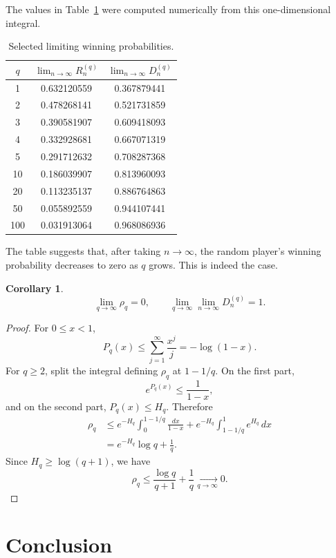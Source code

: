 \documentclass{article}
\newtheorem{corollary}{Corollary}
\begin{document}
The values in Table~\ref{tab:limits} were computed numerically from this
one-dimensional integral.

\begin{table}[h]
\centering
\begin{tabular}{ccc}
\toprule
$q$ & $\lim_{n\to\infty}R_n^{(q)}$ & $\lim_{n\to\infty}D_n^{(q)}$ \\
\midrule
1 & 0.632120559 & 0.367879441 \\
2 & 0.478268141 & 0.521731859 \\
3 & 0.390581907 & 0.609418093 \\
4 & 0.332928681 & 0.667071319 \\
5 & 0.291712632 & 0.708287368 \\
10 & 0.186039907 & 0.813960093 \\
20 & 0.113235137 & 0.886764863 \\
50 & 0.055892559 & 0.944107441 \\
100 & 0.031913064 & 0.968086936 \\
\bottomrule
\end{tabular}
\caption{Selected limiting winning probabilities.}
\label{tab:limits}
\end{table}

The table suggests that, after taking $n\to\infty$, the random player's
winning probability decreases to zero as $q$ grows. This is indeed the case.

\begin{corollary}
\[
    \lim_{q\to\infty}\rho_q=0,
    \qquad
    \lim_{q\to\infty}\lim_{n\to\infty}D_n^{(q)}=1.
\]
\end{corollary}

\begin{proof}
For $0\le x<1$,
\[
    P_q(x)\le \sum_{j=1}^{\infty}\frac{x^j}{j}=-\log(1-x).
\]
For $q\ge2$, split the integral defining $\rho_q$ at $1-1/q$. On the first
part,
\[
    e^{P_q(x)}\le \frac{1}{1-x},
\]
and on the second part, $P_q(x)\le H_q$. Therefore
\[
\begin{aligned}
    \rho_q
    &\le
    e^{-H_q}\int_0^{1-1/q}\frac{dx}{1-x}
    +
    e^{-H_q}\int_{1-1/q}^{1}e^{H_q}\,dx \\
    &=
    e^{-H_q}\log q+\frac{1}{q}.
\end{aligned}
\]
Since $H_q\ge \log(q+1)$, we have
\[
    \rho_q\le \frac{\log q}{q+1}+\frac{1}{q}\xrightarrow[q\to\infty]{}0.
\]
\end{proof}

\section{Conclusion}
\end{document}
